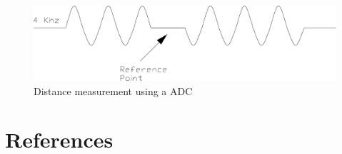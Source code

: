\documentclass[10pt,a4paper]{article}
\begin{document}
\begin{figure}[H]
   \centering
   \includegraphics[width=\textwidth]{adcdemod.pdf}
   \caption{Distance measurement using a ADC}
   \label{fig:adcdemod}
\end{figure}

\newpage






\section{References}


\end{document}
